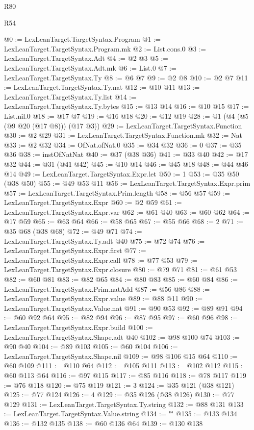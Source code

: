 \begin{lexlean}{R80}
\begin{lexlean}{R54}
\begin{coremodule}
{{{{{{{{{{{{{{{{{{{{{{{{{{{{{{{{{{{{{{{{{{{{{{{{{{@0 := LexLeanTarget.TargetSyntax.Program
@1 := LexLeanTarget.TargetSyntax.Program.mk
@2 := List.cons.{0}
@3 := LexLeanTarget.TargetSyntax.Adt
@4 := @2 @3
@5 := LexLeanTarget.TargetSyntax.Adt.mk
@6 := List.{0}
@7 := LexLeanTarget.TargetSyntax.Ty
@8 := @6 @7
@9 := @2 @8
@10 := @2 @7
@11 := LexLeanTarget.TargetSyntax.Ty.nat
@12 := @10 @11
@13 := LexLeanTarget.TargetSyntax.Ty.list
@14 := LexLeanTarget.TargetSyntax.Ty.bytes
@15 := @13 @14
@16 := @10 @15
@17 := List.nil.{0}
@18 := @17 @7
@19 := @16 @18
@20 := @12 @19
@28 := @1 (@4 (@5 (@9 @20 (@17 @8))) (@17 @3))
@29 := LexLeanTarget.TargetSyntax.Function
@30 := @2 @29
@31 := LexLeanTarget.TargetSyntax.Function.mk
@32 := Nat
@33 := @2 @32
@34 := OfNat.ofNat.{0}
@35 := @34 @32
@36 := 0
@37 := @35 @36
@38 := instOfNatNat
@40 := @37 (@38 @36)
@41 := @33 @40
@42 := @17 @32
@44 := @31 (@41 @42)
@45 := @10 @14
@46 := @45 @18
@48 := @44 @46 @14
@49 := LexLeanTarget.TargetSyntax.Expr.let
@50 := 1
@53 := @35 @50 (@38 @50)
@55 := @49 @53 @11
@56 := LexLeanTarget.TargetSyntax.Expr.prim
@57 := LexLeanTarget.TargetSyntax.Prim.length
@58 := @56 @57
@59 := LexLeanTarget.TargetSyntax.Expr
@60 := @2 @59
@61 := LexLeanTarget.TargetSyntax.Expr.var
@62 := @61 @40
@63 := @60 @62
@64 := @17 @59
@65 := @63 @64
@66 := @58 @65
@67 := @55 @66
@68 := 2
@71 := @35 @68 (@38 @68)
@72 := @49 @71
@74 := LexLeanTarget.TargetSyntax.Ty.adt @40
@75 := @72 @74
@76 := LexLeanTarget.TargetSyntax.Expr.first
@77 := LexLeanTarget.TargetSyntax.Expr.call
@78 := @77 @53
@79 := LexLeanTarget.TargetSyntax.Expr.closure
@80 := @79 @71
@81 := @61 @53
@82 := @60 @81
@83 := @82 @65
@84 := @80 @83
@85 := @60 @84
@86 := LexLeanTarget.TargetSyntax.Prim.natAdd
@87 := @56 @86
@88 := LexLeanTarget.TargetSyntax.Expr.value
@89 := @88 @11
@90 := LexLeanTarget.TargetSyntax.Value.nat
@91 := @90 @53
@92 := @89 @91
@94 := @60 @92 @64
@95 := @82 @94
@96 := @87 @95
@97 := @60 @96
@98 := LexLeanTarget.TargetSyntax.Expr.build
@100 := LexLeanTarget.TargetSyntax.Shape.adt @40
@102 := @98 @100 @74
@103 := @90 @40
@104 := @89 @103
@105 := @60 @104
@106 := LexLeanTarget.TargetSyntax.Shape.nil
@109 := @98 @106 @15 @64
@110 := @60 @109
@111 := @110 @64
@112 := @105 @111
@113 := @102 @112
@115 := @60 @113 @64
@116 := @97 @115
@117 := @85 @116
@118 := @78 @117
@119 := @76 @118
@120 := @75 @119
@121 := 3
@124 := @35 @121 (@38 @121)
@125 := @77 @124
@126 := 4
@129 := @35 @126 (@38 @126)
@130 := @77 @129
@131 := LexLeanTarget.TargetSyntax.Ty.string
@132 := @88 @131
@133 := LexLeanTarget.TargetSyntax.Value.string
@134 := "\""
@135 := @133 @134
@136 := @132 @135
@138 := @60 @136 @64
@139 := @130 @138
}}}}}}}}}}}}}}}}}}}}}}}}}}}}}}}}}}}}}}}}}}}}}}}}}}
\end{coremodule}
\end{lexlean}
\end{lexlean}

